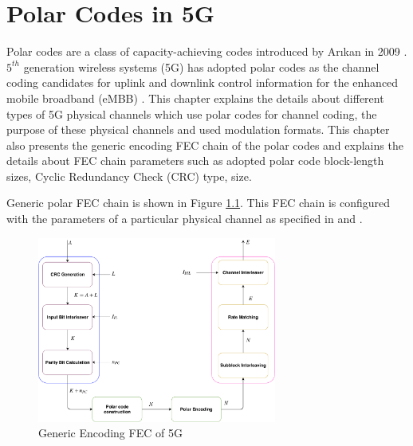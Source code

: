 \chapter{Polar Codes in 5G} \label{polarCodes}
Polar codes are a class of capacity-achieving codes introduced by Ar\i kan in 2009 \cite{Arikan}. $ 5^{th} $ generation wireless systems (5G) has adopted polar codes as the channel coding candidates for uplink and downlink control information for the enhanced mobile broadband (eMBB) \cite{3gpp.38.212}. This chapter explains the details about different types of 5G physical channels which use polar codes for channel coding, the purpose of these physical channels and used modulation formats. This chapter also presents the generic encoding FEC chain of the polar codes and explains the details about FEC chain parameters such as adopted polar code block-length sizes, Cyclic Redundancy Check (CRC) type, size.

Generic polar FEC chain is shown in Figure \ref{fig:Generic5gtx_fec_chain}. This FEC chain is configured with the parameters of a particular physical channel as specified in \cite{3gpp.38.212} and \cite{3gpp.38.211}.

\begin{figure}[!h]
	\centering
	\includegraphics[width=0.7\textwidth]{./figures/Generic5GFECchain.pdf}
	\caption{Generic Encoding FEC of 5G}
	\label{fig:Generic5gtx_fec_chain}
\end{figure}

